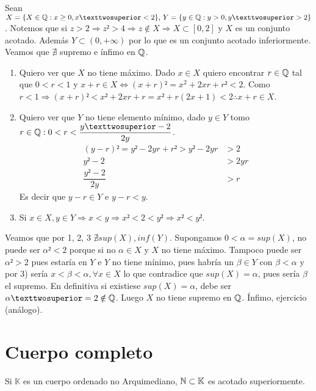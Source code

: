 \begin{eg}
    Sean $X = \{ X \in \Q : x \geq 0, x² < 2 \}\text{, } Y = \{ y \in \Q : y>0, y² > 2 \}$. Notemos que si $z>2 \Rightarrow z² > 4 \Rightarrow z \notin X \Rightarrow X \subset [0, 2]$ y $X$ es un conjunto acotado. Además $Y \subset (0, +\infty)$ por lo que es un conjunto acotado inferiormente. Veamos que $\nexists$ supremo e ínfimo en $\mathbb{Q}$. \begin{enumerate}
        \item Quiero ver que $X$ no tiene máximo. Dado $x \in X$ quiero encontrar $r \in \mathbb{Q}$ tal que $0<r<1$ y $x+r \in X \iff (x+r)² =x^2+2xr+r² < 2$. Como $r<1 \Rightarrow (x+r)²<x²+2xr+r=x²+r(2x+1)<2 \therefore x+r \in X$.
        \item Quiero ver que $Y$ no tiene elemento mínimo, dado $y \in Y$ tomo $r \in \Q : 0 < r < \dfrac{y²-2}{2y}$.
              \begin{align*}
                  (y - r)²          = y² - 2yr + r² > y² - 2yr & > 2   \\
                  y² - 2                                       & > 2yr \\
                  \dfrac{y²-2}{2y}                             & > r
              \end{align*}
              Es decir que $y-r \in Y$ e $y-r < y$.
        \item Si $x \in X, y \in Y \Rightarrow x < y \Rightarrow x² < 2 < y² \Rightarrow x² < y²$.
    \end{enumerate}

    Veamos que por 1, 2, 3 $\nexists sup(X), inf(Y)$. Supongamos $0< \alpha = sup(X)$, no puede ser $\alpha²<2$ porque si no $\alpha \in X$ y $X$ no tiene máximo. Tampoco puede ser $\alpha² > 2$ pues estaría en $Y$ e $Y$ no tiene mínimo, pues habría un $\beta \in Y$ con $\beta < \alpha$ y por 3) sería $x < \beta < \alpha, \forall x \in X$ lo que contradice que $sup(X) = \alpha$, pues sería $\beta$ el supremo.
    En definitiva si existiese $sup(X) = \alpha$, debe ser $\alpha² = 2 \notin \Q$. Luego $X$ no tiene supremo en $\mathbb{Q}$.
    Ínfimo, ejercicio (análogo).
\end{eg}

\section{Cuerpo completo}

\begin{definition}
    Si $\mathbb{K}$ es un cuerpo ordenado no Arquimediano, $\mathbb{N} \subset \mathbb{K}$ es acotado superiormente.
\end{definition}

